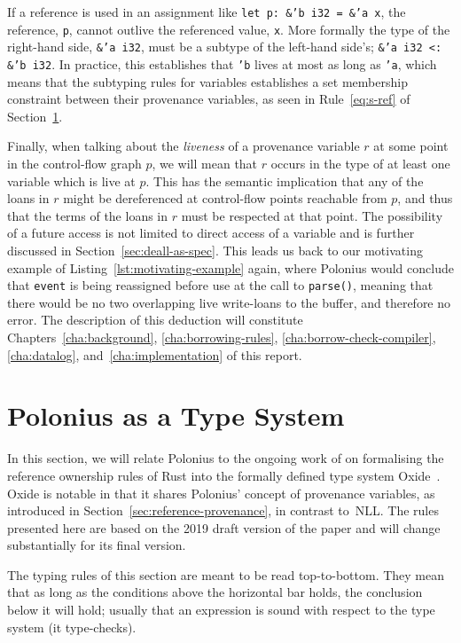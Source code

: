 \documentclass[11pt,a4paper,twoside,openany]{report}
\newcommand{\InRust}[1]{\texttt{#1}}
\renewcommand\_{\textunderscore\allowbreak}
\begin{document}
If a reference is used in an assignment like \InRust{let p: &'b i32 = &'a x},
the reference, \InRust{p}, cannot outlive the referenced value, \InRust{x}. More
formally the type of the right-hand side, \InRust{&'a i32}, must be a subtype of
the left-hand side's; \InRust{&'a i32 <: &'b i32}. In practice, this
establishes that \InRust{'b} lives at most as long as \InRust{'a}, which means
that the subtyping rules for variables establishes a set membership constraint
between their provenance variables, as seen in Rule~\ref{eq:s-ref} of
Section~\ref{sec:type-system}.

Finally, when talking about the \emph{liveness} of a provenance variable $r$ at
some point in the control-flow graph $p$, we will mean that $r$ occurs in the
type of at least one variable which is live at $p$. This has the semantic
implication that any of the loans in $r$ might be dereferenced at control-flow
points reachable from $p$, and thus that the terms of the loans in $r$ must be
respected at that point. The possibility of a future access is not limited to
direct access of a variable and is further discussed in
Section~\ref{sec:deall-as-spec}. This leads us back to our motivating example of
Listing~\ref{lst:motivating-example} again, where Polonius would conclude that
\InRust{event} is being reassigned before use at the call to \InRust{parse()},
meaning that there would be no two overlapping live write-loans to the buffer,
and therefore no error. The description of this deduction will constitute
Chapters~\ref{cha:background}, \ref{cha:borrowing-rules},
\ref{cha:borrow-check-compiler}, \ref{cha:datalog}, and~\ref{cha:implementation}
of this report.


\section{Polonius as a Type System}\label{sec:type-system}

In this section, we will relate Polonius to the ongoing work of
\citeauthor*{weiss_oxide:_2019} on formalising the reference ownership rules of
Rust into the formally defined type system Oxide~\cite{weiss_oxide:_2019}. Oxide
is notable in that it shares Polonius' concept of provenance variables, as
introduced in Section~\ref{sec:reference-provenance}, in contrast to~NLL\@. The
rules presented here are based on the 2019 draft version of the paper and will
change substantially for its final version.

The typing rules of this section are meant to be read top-to-bottom. They mean
that as long as the conditions above the horizontal bar holds, the conclusion
below it will hold; usually that an expression is sound with respect to the type
system (it type-checks).
\end{document}
